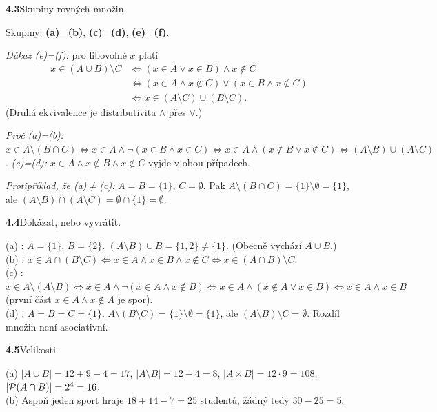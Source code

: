 \documentclass[11pt,a4paper]{article}
\newcommand{\zad}[2]{\par\Needspace*{4cm}\vspace{1.1em}\noindent\textcolor{accent}{\sffamily\bfseries #1}\enspace #2\par}
\begin{document}
\zad{4.3}{Skupiny rovných množin.}
\begin{reseni}
Skupiny: \textbf{(a)=(b)}, \textbf{(c)=(d)}, \textbf{(e)=(f)}.

\smallskip
\emph{Důkaz (e)=(f):} pro libovolné $x$ platí
\[
\begin{aligned}
x\in(A\cup B)\setminus C&\Leftrightarrow(x\in A\lor x\in B)\land x\notin C\\
&\Leftrightarrow(x\in A\land x\notin C)\lor(x\in B\land x\notin C)\\
&\Leftrightarrow x\in(A\setminus C)\cup(B\setminus C).
\end{aligned}
\]
(Druhá ekvivalence je distributivita $\land$ přes $\lor$.)

\smallskip
\emph{Proč (a)=(b):} $x\in A\setminus(B\cap C)\Leftrightarrow x\in A\land\neg(x\in B\land x\in C)\Leftrightarrow x\in A\land(x\notin B\lor x\notin C)\Leftrightarrow(A\setminus B)\cup(A\setminus C)$. \emph{(c)=(d):} $x\in A\land x\notin B\land x\notin C$ vyjde v obou případech.

\smallskip
\emph{Protipříklad, že (a)$\ne$(c):} $A=B=\{1\}$, $C=\emptyset$. Pak $A\setminus(B\cap C)=\{1\}\setminus\emptyset=\{1\}$, ale $(A\setminus B)\cap(A\setminus C)=\emptyset\cap\{1\}=\emptyset$.
\end{reseni}

\zad{4.4}{Dokázat, nebo vyvrátit.}
\begin{reseni}
(a) \nepravda: $A=\{1\}$, $B=\{2\}$. $(A\setminus B)\cup B=\{1,2\}\neq\{1\}$. (Obecně vychází $A\cup B$.)\\[3pt]
(b) \pravda: $x\in A\cap(B\setminus C)\Leftrightarrow x\in A\land x\in B\land x\notin C\Leftrightarrow x\in(A\cap B)\setminus C$.\\[3pt]
(c) \pravda: $x\in A\setminus(A\setminus B)\Leftrightarrow x\in A\land\neg(x\in A\land x\notin B)\Leftrightarrow x\in A\land(x\notin A\lor x\in B)\Leftrightarrow x\in A\land x\in B$ (první část $x\in A\land x\notin A$ je spor).\\[3pt]
(d) \nepravda: $A=B=C=\{1\}$. $A\setminus(B\setminus C)=\{1\}\setminus\emptyset=\{1\}$, ale $(A\setminus B)\setminus C=\emptyset$. Rozdíl množin není asociativní.
\end{reseni}

\zad{4.5}{Velikosti.}
\begin{reseni}
(a) $|A\cup B|=12+9-4=17$, $|A\setminus B|=12-4=8$, $|A\times B|=12\cdot9=108$, $|\mathcal P(A\cap B)|=2^4=16$.\\
(b) Aspoň jeden sport hraje $18+14-7=25$ studentů, žádný tedy $30-25=5$.
\end{reseni}
\end{document}
